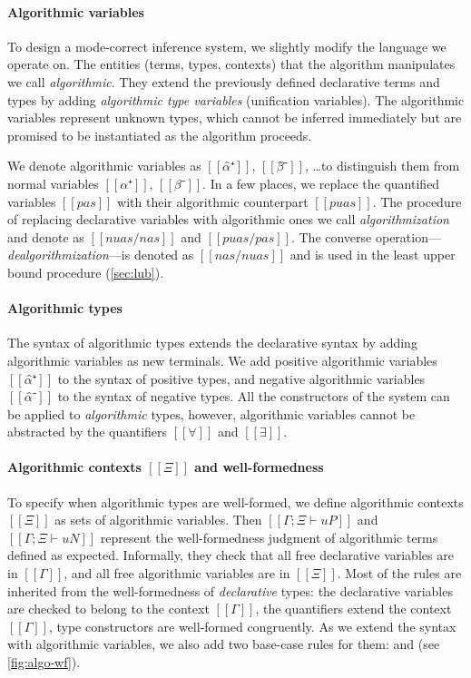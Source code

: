 \paragraph*{Algorithmic variables}
To design a mode-correct inference system, we slightly modify the language we operate on.
The entities (terms, types, contexts) that the algorithm manipulates we call \emph{algorithmic}. 
They extend the previously defined declarative terms and types by adding 
\emph{algorithmic type variables} (\aka unification variables). 
The algorithmic variables represent unknown types, 
which cannot be inferred immediately but are promised to be instantiated
as the algorithm proceeds.

We denote algorithmic variables as $[[α̂⁺]]$, $[[β̂⁻]]$, \dots to distinguish
them from normal variables $[[α⁺]]$, $[[β⁻]]$. In a few places, we replace the
quantified variables $[[pas]]$ with their algorithmic counterpart $[[puas]]$.
The procedure of replacing declarative variables with algorithmic ones we call
\emph{algorithmization} and denote as $[[ nuas/nas ]]$ and $[[ puas/pas ]]$. The
converse operation---\emph{dealgorithmization}---is denoted as $[[ nas/nuas ]]$ and 
is used in the least upper bound procedure (\cref{sec:lub}).

\paragraph*{Algorithmic types}
The syntax of algorithmic types extends the declarative syntax by adding
algorithmic variables as new terminals. We add positive algorithmic variables $[[α̂⁺]]$ 
to the syntax of positive types, and negative algorithmic variables $[[α̂⁻]]$ to the 
syntax of negative types. All the constructors of the system can be applied 
to \emph{algorithmic} types, however, algorithmic variables cannot be abstracted by the
quantifiers $[[∀]]$ and $[[∃]]$.

\paragraph*{Algorithmic contexts $[[Ξ]]$ and well-formedness}
To specify when algorithmic types are well-formed, we define algorithmic
contexts $[[Ξ]]$ as sets of algorithmic variables. Then
$[[Γ ; Ξ ⊢ uP]]$ and $[[Γ ; Ξ ⊢ uN]]$ represent the well-formedness judgment of
algorithmic terms defined as expected. Informally, they check that all free
declarative variables are in $[[Γ]]$, and all free algorithmic variables are in
$[[Ξ]]$. Most of the rules are inherited from the well-formedness of
\emph{declarative} types: the declarative variables are checked to belong to the
context $[[Γ]]$, the quantifiers extend the context $[[Γ]]$, type constructors are
well-formed congruently. As we extend the syntax with algorithmic variables, we
also add two base-case rules for them:  and
 (see \cref{fig:algo-wf}).

